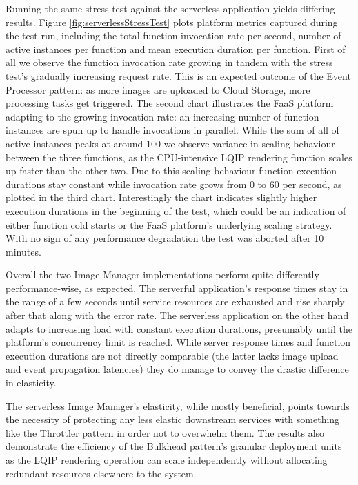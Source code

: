 Running the same stress test against the serverless application yields differing results. Figure \ref{fig:serverlessStressTest} plots platform metrics captured during the test run, including the total function invocation rate per second, number of active instances per function and mean execution duration per function. First of all we observe the function invocation rate growing in tandem with the stress test's gradually increasing request rate. This is an expected outcome of the Event Processor pattern: as more images are uploaded to Cloud Storage, more processing tasks get triggered. The second chart illustrates the FaaS platform adapting to the growing invocation rate: an increasing number of function instances are spun up to handle invocations in parallel. While the sum of all of active instances peaks at around 100 we observe variance in scaling behaviour between the three functions, as the CPU-intensive LQIP rendering function scales up faster than the other two. Due to this scaling behaviour function execution durations stay constant while invocation rate grows from 0 to 60 per second, as plotted in the third chart. Interestingly the chart indicates slightly higher execution durations in the beginning of the test, which could be an indication of either function cold starts or the FaaS platform's underlying scaling strategy. With no sign of any performance degradation the test was aborted after 10 minutes.


Overall the two Image Manager implementations perform quite differently performance-wise, as expected. The serverful application's response times stay in the range of a few seconds until service resources are exhausted and rise sharply after that along with the error rate. The serverless application on the other hand adapts to increasing load with constant execution durations, presumably until the platform's concurrency limit is reached. While server response times and function execution durations are not directly comparable (the latter lacks image upload and event propagation latencies) they do manage to convey the drastic difference in elasticity.

The serverless Image Manager's elasticity, while mostly beneficial, points towards the necessity of protecting any less elastic downstream services with something like the Throttler pattern in order not to overwhelm them. The results also demonstrate the efficiency of the Bulkhead pattern's granular deployment units as the LQIP rendering operation can scale independently without allocating redundant resources elsewhere to the system.

